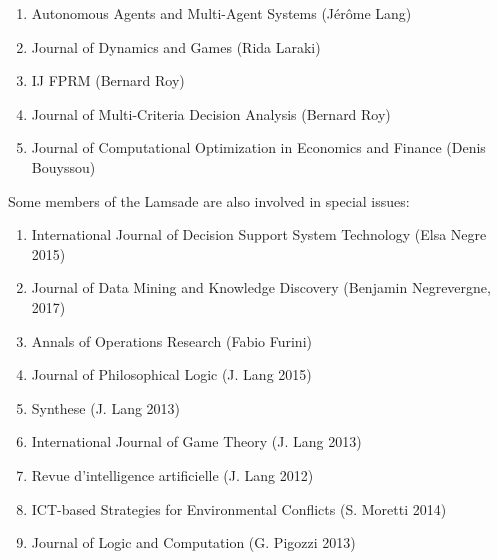 \documentclass[version=last, pagesize, twoside=semi, DIV=calc, 12pt, a4paper, french, english, bibliography=totoc]{scrartcl}
\begin{document}
\begin{enumerate}
\item Autonomous Agents and Multi-Agent Systems  (J\'er\^ome Lang)
\item Journal of Dynamics and Games (Rida Laraki)
\item  IJ FPRM (Bernard Roy) 
\item  Journal of Multi-Criteria Decision Analysis (Bernard Roy)
\item Journal of Computational Optimization in Economics and Finance (Denis Bouyssou)
\end{enumerate}

Some members of the Lamsade are also involved in special issues:
\begin{enumerate}
\item  International Journal of Decision Support System Technology (Elsa Negre 2015)
\item Journal of Data Mining and Knowledge Discovery (Benjamin Negrevergne, 2017) 
\item Annals of Operations Research (Fabio Furini)%
\item Journal of Philosophical Logic (J. Lang 2015) 
\item Synthese (J. Lang 2013)
\item International Journal of Game Theory (J. Lang 2013)
\item Revue d'intelligence artificielle (J. Lang 2012)
\item ICT-based Strategies for Environmental Conflicts (S. Moretti 2014)
\item Journal of Logic and Computation (G. Pigozzi 2013)
\end{enumerate}
\end{document}
